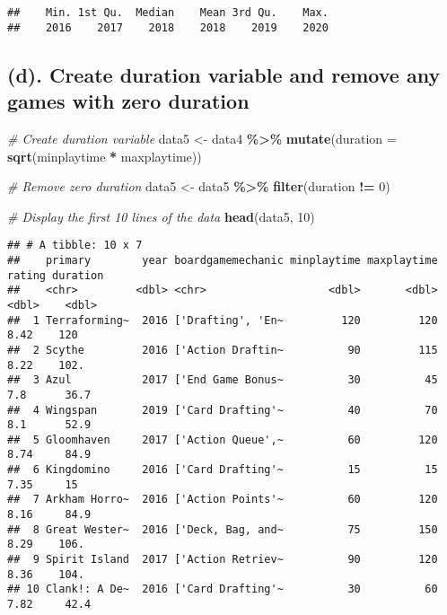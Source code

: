 \documentclass[
]{article}
\newenvironment{Shaded}{\begin{snugshade}}{\end{snugshade}}
\newcommand{\AttributeTok}[1]{\textcolor[rgb]{0.13,0.29,0.53}{#1}}
\newcommand{\CommentTok}[1]{\textcolor[rgb]{0.56,0.35,0.01}{\textit{#1}}}
\newcommand{\DecValTok}[1]{\textcolor[rgb]{0.00,0.00,0.81}{#1}}
\newcommand{\FunctionTok}[1]{\textcolor[rgb]{0.13,0.29,0.53}{\textbf{#1}}}
\newcommand{\NormalTok}[1]{#1}
\newcommand{\OtherTok}[1]{\textcolor[rgb]{0.56,0.35,0.01}{#1}}
\newcommand{\SpecialCharTok}[1]{\textcolor[rgb]{0.81,0.36,0.00}{\textbf{#1}}}
\begin{document}
\begin{verbatim}
##    Min. 1st Qu.  Median    Mean 3rd Qu.    Max. 
##    2016    2017    2018    2018    2019    2020
\end{verbatim}

\hypertarget{d.-create-duration-variable-and-remove-any-games-with-zero-duration}{%
\subsection{\texorpdfstring{(d). Create \textbf{duration} variable and remove any games with zero \textbf{duration}}{(d). Create duration variable and remove any games with zero duration}}\label{d.-create-duration-variable-and-remove-any-games-with-zero-duration}}

\begin{Shaded}
\begin{Highlighting}[]
\CommentTok{\# Create duration variable}
\NormalTok{data5 }\OtherTok{\textless{}{-}}\NormalTok{ data4 }\SpecialCharTok{\%\textgreater{}\%}
  \FunctionTok{mutate}\NormalTok{(}\AttributeTok{duration =} \FunctionTok{sqrt}\NormalTok{(minplaytime }\SpecialCharTok{*}\NormalTok{ maxplaytime))}

\CommentTok{\# Remove zero duration}
\NormalTok{data5 }\OtherTok{\textless{}{-}}\NormalTok{ data5 }\SpecialCharTok{\%\textgreater{}\%}
  \FunctionTok{filter}\NormalTok{(duration }\SpecialCharTok{!=} \DecValTok{0}\NormalTok{)}

\CommentTok{\# Display the first 10 lines of the data}
\FunctionTok{head}\NormalTok{(data5, }\DecValTok{10}\NormalTok{)}
\end{Highlighting}
\end{Shaded}

\begin{verbatim}
## # A tibble: 10 x 7
##    primary        year boardgamemechanic minplaytime maxplaytime rating duration
##    <chr>         <dbl> <chr>                   <dbl>       <dbl>  <dbl>    <dbl>
##  1 Terraforming~  2016 ['Drafting', 'En~         120         120   8.42    120  
##  2 Scythe         2016 ['Action Draftin~          90         115   8.22    102. 
##  3 Azul           2017 ['End Game Bonus~          30          45   7.8      36.7
##  4 Wingspan       2019 ['Card Drafting'~          40          70   8.1      52.9
##  5 Gloomhaven     2017 ['Action Queue',~          60         120   8.74     84.9
##  6 Kingdomino     2016 ['Card Drafting'~          15          15   7.35     15  
##  7 Arkham Horro~  2016 ['Action Points'~          60         120   8.16     84.9
##  8 Great Wester~  2016 ['Deck, Bag, and~          75         150   8.29    106. 
##  9 Spirit Island  2017 ['Action Retriev~          90         120   8.36    104. 
## 10 Clank!: A De~  2016 ['Card Drafting'~          30          60   7.82     42.4
\end{verbatim}
\end{document}
